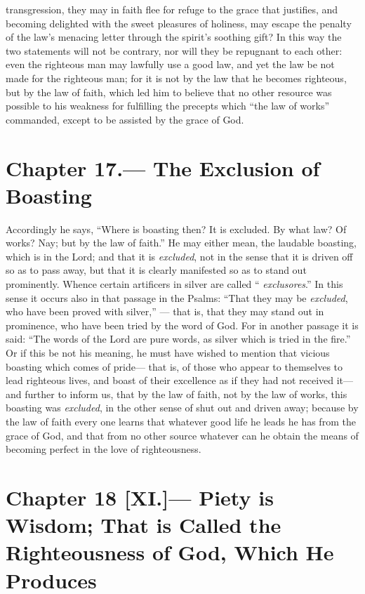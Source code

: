 \documentclass[10pt, twocolumn, oneside, a4paper]{memoir}
\newcommand{\gloss}[1]{%
    \marginpar[\RaggedLeft \footnotesize{#1}]{\RaggedRight \footnotesize{#1}}}
\begin{document}
transgression, they may in faith flee for refuge to the grace that justifies, and becoming delighted with the sweet pleasures of holiness, may escape the penalty of the law's menacing letter through the spirit's soothing gift? In this way the two statements will not be contrary, nor will they be repugnant to each other: even the righteous man may lawfully use a good law, and yet the law be not made for the righteous man; for it is not by the law that he becomes righteous, but by the law of faith, which led him to believe that no other resource was possible to his weakness for fulfilling the precepts which ``the law of works'' \gloss{Romans 3:27} commanded, except to be assisted by the grace of God.
\section*{Chapter 17.— The Exclusion of Boasting}


Accordingly he says, ``Where is boasting then? It is excluded. By what law? Of works? Nay; but by the law of faith.'' \gloss{Romans 3:27} He may either mean, the laudable boasting, which is in the Lord; and that it is \textit{excluded}, not in the sense that it is driven off so as to pass away, but that it is clearly manifested so as to stand out prominently. Whence certain artificers in silver are called `` \textit{exclusores}.''  In this sense it occurs also in that passage in the Psalms: ``That they may be \textit{excluded}, who have been proved with silver,'' — that is, that they may stand out in prominence, who have been tried by the word of God. For in another passage it is said: ``The words of the Lord are pure words, as silver which is tried in the fire.''  Or if this be not his meaning, he must have wished to mention that vicious boasting which comes of pride— that is, of those who appear to themselves to lead righteous lives, and boast of their excellence as if they had not received it—and further to inform us, that by the law of faith, not by the law of works, this boasting was \textit{excluded}, in the other sense of shut out and driven away; because by the law of faith every one learns that whatever good life he leads he has from the grace of God, and that from no other source whatever can he obtain the means of becoming perfect in the love of righteousness.
\section*{Chapter 18 [XI.]— Piety is Wisdom; That is Called the Righteousness of God, Which He Produces}
\end{document}
